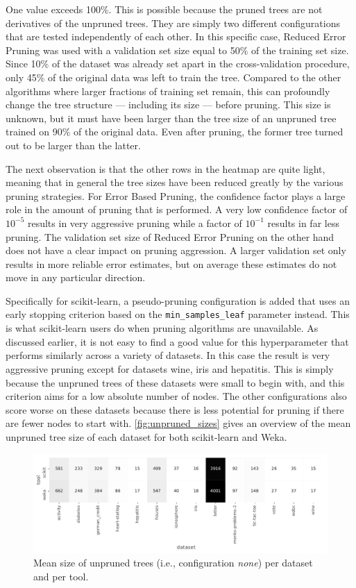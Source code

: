 One value exceeds 100\%. This is possible because the pruned trees are not derivatives of the unpruned trees. They are simply two different configurations that are tested independently of each other. In this specific case, Reduced Error Pruning was used with a validation set size equal to 50\% of the training set size. Since 10\% of the dataset was already set apart in the cross-validation procedure, only 45\% of the original data was left to train the tree. Compared to the other algorithms where larger fractions of training set remain, this can profoundly change the tree structure --- including its size --- before pruning. This size is unknown, but it must have been larger than the tree size of an unpruned tree trained on 90\% of the original data. Even after pruning, the former tree turned out to be larger than the latter.

The next observation is that the other rows in the heatmap are quite light, meaning that in general the tree sizes have been reduced greatly by the various pruning strategies. For Error Based Pruning, the confidence factor plays a large role in the amount of pruning that is performed. A very low confidence factor of $10^{-5}$ results in very aggressive pruning while a factor of $10^{-1}$ results in far less pruning. The validation set size of Reduced Error Pruning on the other hand does not have a clear impact on pruning aggression. A larger validation set only results in more reliable error estimates, but on average these estimates do not move in any particular direction.

Specifically for scikit-learn, a pseudo-pruning configuration is added that uses an early stopping criterion based on the \texttt{min\_samples\_leaf} parameter instead. This is what scikit-learn users do when pruning algorithms are unavailable. As discussed earlier, it is not easy to find a good value for this hyperparameter that performs similarly across a variety of datasets. In this case the result is very aggressive pruning except for datasets wine, iris and hepatitis. This is simply because the unpruned trees of these datasets were small to begin with, and this criterion aims for a low absolute number of nodes. The other configurations also score worse on these datasets because there is less potential for pruning if there are fewer nodes to start with. \autoref{fig:unpruned_sizes} gives an overview of the mean unpruned tree size of each dataset for both scikit-learn and Weka.

\begin{figure}[htp]
    \includegraphics[width=\textwidth]{img/heatmap_n_nodes_unpruned.pdf}
    \caption{Mean size of unpruned trees (i.e., configuration \emph{none}) per dataset and per tool.}%
    \label{fig:unpruned_sizes}
\end{figure}


